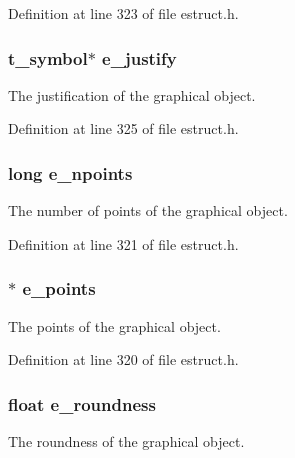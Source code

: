 Definition at line 323 of file estruct.\-h.

\hypertarget{struct__egobj_a41dc1b542ee19a3171a52480dff2c664}{
\subsubsection[{e\-\_\-justify}]{\setlength{\rightskip}{0pt plus 5cm}t\-\_\-symbol$\ast$ e\-\_\-justify}}\label{struct__egobj_a41dc1b542ee19a3171a52480dff2c664}
The justification of the graphical object. 

Definition at line 325 of file estruct.\-h.

\hypertarget{struct__egobj_a216eff6ab0216b35e215bd1c1b8fb0d0}{
\subsubsection[{e\-\_\-npoints}]{\setlength{\rightskip}{0pt plus 5cm}long e\-\_\-npoints}}\label{struct__egobj_a216eff6ab0216b35e215bd1c1b8fb0d0}
The number of points of the graphical object. 

Definition at line 321 of file estruct.\-h.

\hypertarget{struct__egobj_a579eafd42827c9bdcddc613774309ad3}{
\subsubsection[{e\-\_\-points}]{$\ast$ e\-\_\-points}}\label{struct__egobj_a579eafd42827c9bdcddc613774309ad3}
The points of the graphical object. 

Definition at line 320 of file estruct.\-h.

\hypertarget{struct__egobj_ab2c5a6f93a125c4862295e28aad05a74}{
\subsubsection[{e\-\_\-roundness}]{\setlength{\rightskip}{0pt plus 5cm}float e\-\_\-roundness}}\label{struct__egobj_ab2c5a6f93a125c4862295e28aad05a74}
The roundness of the graphical object. 

